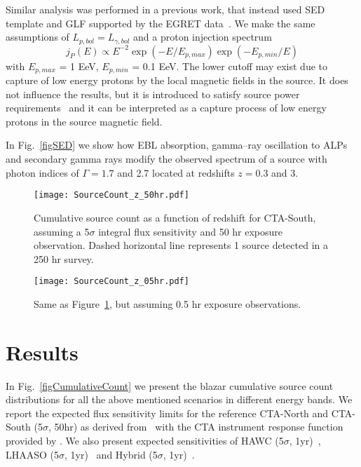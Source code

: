 \documentclass[final,5p]{elsarticle}
\begin{document}
Similar analysis was performed in a previous work, that instead used SED template and GLF supported by the EGRET data~\cite{Yoshi2ndGamma}. We make the same assumptions of $L_{p,bol}=L_{\gamma,bol}$ and a proton injection spectrum
\begin{equation} 
\label{eqProtoSED}
j_P(E) \propto E^{-2} \exp(-E/E_{p,max}) \exp(-E_{p,min}/E)
\end{equation}
with $E_{p,max}$ = 1 EeV, $E_{p,min}$ = 0.1 EeV. The lower cutoff may exist due to capture of low energy protons by the local magnetic fields in the source. It does not influence the results, but it is introduced to satisfy source power requirements~\cite{OlegCode1,EminPower} and it can be interpreted as a capture process of low energy protons in the source magnetic field. 

In Fig.~\ref{figSED} we show how EBL absorption, gamma--ray oscillation to ALPs and secondary gamma rays modify the observed spectrum of a source with photon indices of $\Gamma=1.7$ and 2.7 located at redshifts $z=0.3$ and 3.

\begin{figure*}[h!]
  \centering
\texttt{[image: SourceCount\_z\_50hr.pdf]} 
\caption{Cumulative source count as a function of redshift for CTA-South, assuming a 5$\sigma$ integral flux sensitivity and 50 hr exposure observation. Dashed horizontal line represents 1 source detected in a 250 hr survey.}
\label{figCumulativeCount_z_50}
\end{figure*}


\begin{figure*}[h!]
  \centering
\texttt{[image: SourceCount\_z\_05hr.pdf]} 
\caption{Same as Figure~\ref{figCumulativeCount_z_50}, but assuming 0.5 hr exposure observations.}
\label{figCumulativeCount_z_05}
\end{figure*}

\section{Results}\label{sec:Results}
In Fig.~\ref{figCumulativeCount} we present the blazar cumulative source count distributions for all the above mentioned scenarios in different energy bands. We report the expected flux sensitivity limits for the reference CTA-North and CTA-South (5$\sigma$, 50hr) as derived from~\cite{CTools} with the CTA instrument response function provided by \cite{CTASens}. We also present expected sensitivities of HAWC (5$\sigma$, 1yr)~\cite{HAWCSens}, LHAASO (5$\sigma$, 1yr)~\cite{LHASSOSens} and Hybrid (5$\sigma$, 1yr)~\cite{Hybrid}. 
\end{document}
